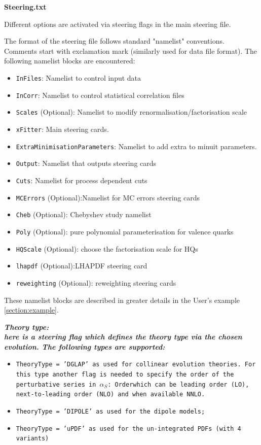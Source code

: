 \begin{description}
\item \bf{Steering.txt}\rm 

Different options are activated via steering flags in the main steering file.
 
The format of the steering file follows standard "namelist" conventions.
Comments start with exclamation mark (similarly used for data file format).
The following namelist blocks are encountered:
\begin{itemize}
\item  {\tt InFiles}: Namelist to control input data
\item  {\tt InCorr}: Namelist to control statistical correlation files
\item  {\tt Scales} (Optional): Namelist to modify renormalisation/factorisation scale
\item  {\tt xFitter}: Main steering cards. 
\item  {\tt ExtraMinimisationParameters}:  Namelist to add extra to minuit parameters.
\item  {\tt Output}: Namelist that outputs steering cards 
\item  {\tt Cuts}: Namelist for process dependent cuts
\item  {\tt MCErrors} (Optional):Namelist for MC errors steering cards
\item  {\tt Cheb} (Optional): Chebyshev study namelist
\item  {\tt Poly} (Optional): pure polynomial parameterisation for valence quarks
\item  {\tt HQScale} (Optional): choose the factorisation scale for HQs
\item  {\tt lhapdf} (Optional):LHAPDF steering card
\item  {\tt reweighting} (Optional): reweighting steering cards
\end{itemize}

These namelist blocks are described in greater details in the User's example \ref{section:example}. 


\begin{description}
\item \it\bf Theory type: \rm\\
 
here is a steering flag which defines the theory type via the chosen evolution.
The following types are supported:
\begin{itemize}
\item \tt{TheoryType = 'DGLAP' }\rm as used for collinear evolution theories. For this type another 
 flag is needed to specify the order of the perturbative series in $\alpha_S$:
\tt{Order}\rm which can be leading order (LO), next-to-leading order (NLO) and when available NNLO.
\item \tt{TheoryType = 'DIPOLE' }\rm as used for the dipole models;
\item \tt{TheoryType = 'uPDF' }\rm as used for the un-integrated PDFs (with 4 variants)
\end{itemize}


\end{description}
\end{description}
